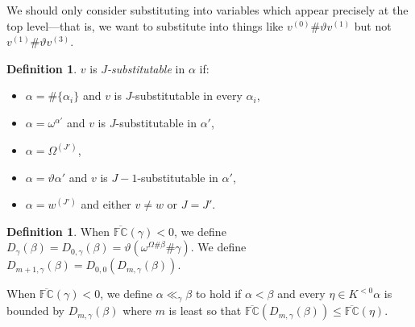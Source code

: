 \documentclass[11pt]{amsart}
\theoremstyle{definition}
\newtheorem{definition}[theorem]{Definition}
\begin{document}
We should only consider substituting into variables which appear precisely at the top level---that is, we want to substitute into things like $v^{(0)}\#\vartheta v^{(1)}$ but not $v^{(1)}\#\vartheta v^{(3)}$.
\begin{definition}
  $v$ is \emph{$J$-substitutable} in $\alpha$ if:
  \begin{itemize}
  \item $\alpha=\#\{\alpha_i\}$ and $v$ is $J$-substitutable in every $\alpha_i$,
  \item $\alpha=\omega^{\alpha'}$ and $v$ is $J$-substitutable in $\alpha'$,
  \item $\alpha=\Omega^{(J')}$,
  \item $\alpha=\vartheta\alpha'$ and $v$ is $J-1$-substitutable in $\alpha'$,
  \item $\alpha=w^{(J')}$ and either $v\neq w$ or $J=J'$.
  \end{itemize}
\end{definition}

\begin{definition}
  When $\overline{\mathbb{FC}}(\gamma)<0$, we define $D_{\gamma}(\beta)=D_{0,\gamma}(\beta)=\vartheta(\omega^{\Omega\#\beta}\#\gamma)$.  We define $D_{m+1,\gamma}(\beta)=D_{0,0}(D_{m,\gamma}(\beta))$.

  When $\overline{\mathbb{FC}}(\gamma)<0$, we define $\alpha\ll_\gamma\beta$ to hold if $\alpha<\beta$ and every $\eta\in K^{<0}\alpha$ is bounded by $D_{m,\gamma}(\beta)$ where $m$ is least so that $\overline{\mathbb{FC}}(D_{m,\gamma}(\beta))\leq\overline{\mathbb{FC}}(\eta)$.  
\end{definition}
\end{document}
